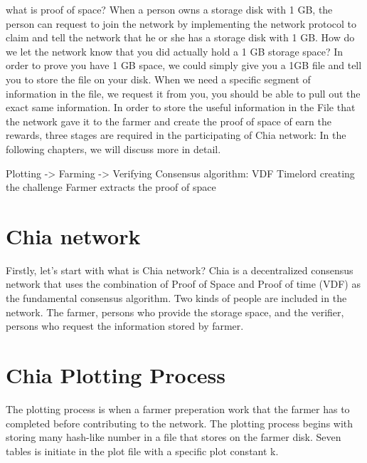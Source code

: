 \documentclass[sigconf, nonacm, natbib=false]{acmart}
\begin{document}
what is proof of space? When a person owns a storage disk with 1 GB, the person can request to join the network by implementing the network protocol to claim and tell the network that he or she has a storage disk with 1 GB. How do we let the network know that you did actually hold a 1 GB storage space? In order to prove you have 1 GB space, we could simply give you a 1GB file and tell you to store the file on your disk. When we need a specific segment of information in the file, we request it from you, you should be able to pull out the exact same information.
In order to store the useful information in the File that the network gave it to the farmer and create the proof of space of earn the rewards, three stages are required in the participating of Chia network: In the following chapters, we will discuss more in detail.

Plotting -> Farming -> Verifying
Consensus algorithm: VDF
Timelord creating the challenge
Farmer extracts the proof of space



\section{Chia network}
Firstly, let's start with what is Chia network? Chia is a decentralized consensus network that uses the combination of Proof of Space and Proof of time (VDF) as the fundamental consensus algorithm. Two kinds of people are included in the network. The farmer, persons who provide the storage space, and the verifier, persons who request the information stored by farmer.



\section{Chia Plotting Process}
The plotting process is when a farmer preperation work that the farmer has to completed before contributing to the network. The plotting process begins with storing many hash-like number in a file that stores on the farmer disk. Seven tables is initiate in the plot file with a specific plot constant k. 
\end{document}
